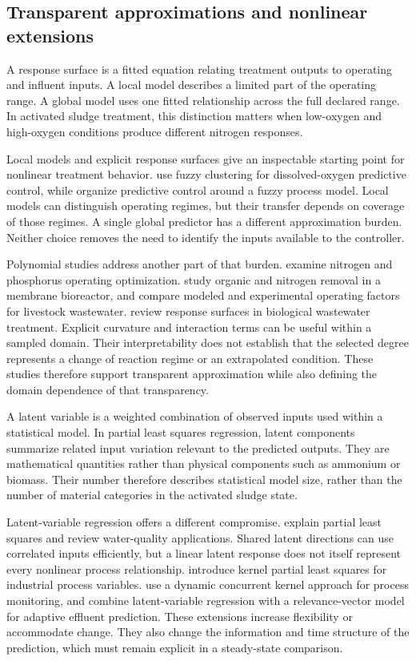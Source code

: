 \subsection{Transparent approximations and nonlinear extensions}

A response surface is a fitted equation relating treatment outputs to operating and influent inputs. A local model describes a limited part of the operating range. A global model uses one fitted relationship across the full declared range. In activated sludge treatment, this distinction matters when low-oxygen and high-oxygen conditions produce different nitrogen responses.

Local models and explicit response surfaces give an inspectable starting point for nonlinear treatment behavior. \citet{Li2020} use fuzzy clustering for dissolved-oxygen predictive control, while \citet{Yang2014} organize predictive control around a fuzzy process model. Local models can distinguish operating regimes, but their transfer depends on coverage of those regimes. A single global predictor has a different approximation burden. Neither choice removes the need to identify the inputs available to the controller.

Polynomial studies address another part of that burden. \citet{Kim2009} examine nitrogen and phosphorus operating optimization. \citet{Lim2011} study organic and nitrogen removal in a membrane bioreactor, and \citet{Ahn2014} compare modeled and experimental operating factors for livestock wastewater. \citet{Nazlabadi2021} review response surfaces in biological wastewater treatment. Explicit curvature and interaction terms can be useful within a sampled domain. Their interpretability does not establish that the selected degree represents a change of reaction regime or an extrapolated condition. These studies therefore support transparent approximation while also defining the domain dependence of that transparency.

A latent variable is a weighted combination of observed inputs used within a statistical model. In partial least squares regression, latent components summarize related input variation relevant to the predicted outputs. They are mathematical quantities rather than physical components such as ammonium or biomass. Their number therefore describes statistical model size, rather than the number of material categories in the activated sludge state.

Latent-variable regression offers a different compromise. \citet{Wold2001} explain partial least squares and \citet{Khatri2020} review water-quality applications. Shared latent directions can use correlated inputs efficiently, but a linear latent response does not itself represent every nonlinear process relationship. \citet{Woo2009} introduce kernel partial least squares for industrial process variables. \citet{Liu2021} use a dynamic concurrent kernel approach for process monitoring, and \citet{Yang2021} combine latent-variable regression with a relevance-vector model for adaptive effluent prediction. These extensions increase flexibility or accommodate change. They also change the information and time structure of the prediction, which must remain explicit in a steady-state comparison.


